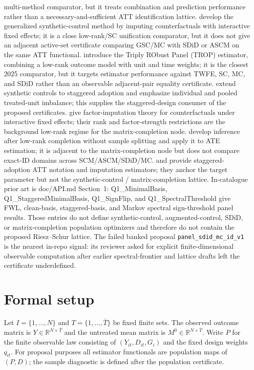 \documentclass[11pt]{article}
\newcommand{\R}{\mathbb{R}}
\theoremstyle{definition}
\theoremstyle{plain}
\theoremstyle{remark}
\begin{document}
multi-method comparator, but it treats combination and prediction performance
rather than a necessary-and-sufficient ATT identification lattice.
\citet[Sections~2--3, interactive-fixed-effect counterfactual estimator]{Xu2017}
develop the generalized synthetic-control method by imputing counterfactuals
with interactive fixed effects; it is a close low-rank/SC unification
comparator, but it does not give an adjacent active-set certificate comparing
GSC/MC with SDiD or ASCM on the same ATT functional.
\citet[arXiv v3 abstract and Section~2 estimator definition]{AtheyImbensQuViviano2025}
introduce the Triply RObust Panel (TROP) estimator, combining a low-rank
outcome model with unit and time weights; it is the closest 2025 comparator,
but it targets estimator performance against TWFE, SC, MC, and SDiD rather
than an observable adjacent-pair equality certificate.
\citet{BenMichaelFellerRothstein2022} extend synthetic controls to staggered
adoption and emphasize individual and pooled treated-unit imbalance; this
supplies the staggered-design consumer of the proposed certificates.
\citet{BaiNg2021} give factor-imputation theory for counterfactuals under
interactive fixed effects; their rank and factor-strength restrictions are the
background low-rank regime for the matrix-completion node.
\citet{ChoiKwonLiao2024} develop inference after low-rank completion without
sample splitting and apply it to ATE estimation; it is adjacent to the
matrix-completion node but does not compare exact-ID domains across
SCM/ASCM/SDiD/MC.
\citet{CallawaySantAnna2021} and \citet{BorusyakJaravelSpiess2024} provide
staggered-adoption ATT notation and imputation estimators; they anchor the
target parameter but not the synthetic-control / matrix-completion lattice.
In-catalogue prior art is doc/API.md Section~1: Q1\_MinimalBasis,
Q1\_StaggeredMinimalBasis, Q1\_SignFlip, and Q1\_SpectralThreshold give
FWL, clean-basis, staggered-basis, and Markov spectral sign-threshold panel
results. Those entries do not define synthetic-control, augmented-control,
SDiD, or matrix-completion population optimizers and therefore do not contain
the proposed Riesz--Schur lattice. The failed banked proposal
\texttt{panel\_sdid\_mc\_id\_v1} is the nearest in-repo signal: its reviewer
asked for explicit finite-dimensional observable computation after earlier
spectral-frontier and lattice drafts left the certificate underdefined.

\section{Formal setup}\label{sec:setup}
Let $I=\{1,\ldots,N\}$ and $T=\{1,\ldots,\bar T\}$ be fixed finite sets.
The observed outcome matrix is $Y\in\R^{N\times \bar T}$ and the untreated
mean matrix is $M^0\in\R^{N\times\bar T}$. Write $P$ for the finite
observable law consisting of $(Y_{it},D_{it},G_i)$ and the fixed design
weights $q_{it}$. For proposal purposes all estimator functionals are
population maps of $(P,D)$; the sample diagnostic is defined after the
population certificate.
\end{document}
